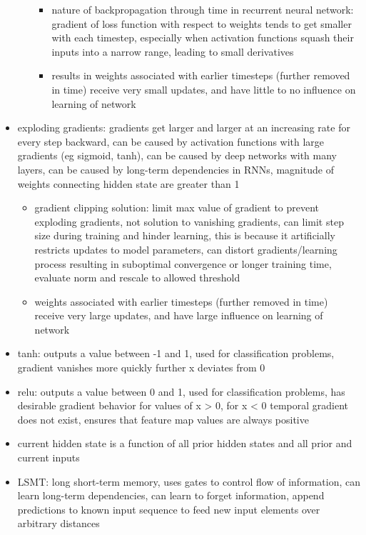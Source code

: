 \documentclass[10pt]{article}
\begin{document}
\begin{itemize}[label=\(\star\), leftmargin=1em, itemsep=-0.3em]
\begin{itemize}[label=\(\star\), leftmargin=1em, itemsep=-0.3em]
\begin{itemize}[label=\(\star\), leftmargin=1em, itemsep=-0.3em]
                    \item nature of backpropagation through time in recurrent neural network: gradient of loss function with respect to weights tends to get smaller with each timestep, especially when activation functions squash their inputs into a narrow range, leading to small derivatives
                    \item results in weights associated with earlier timesteps (further removed in time) receive very small updates, and have little to no influence on learning of network
                \end{itemize}
        \end{itemize}
    \item exploding gradients: gradients get larger and larger at an increasing rate for every step backward, can be caused by activation functions with large gradients (eg sigmoid, tanh), can be caused by deep networks with many layers, can be caused by long-term dependencies in RNNs, magnitude of weights connecting hidden state are greater than 1
        \begin{itemize}[label=\(\star\), leftmargin=1em, itemsep=-0.3em]
            \item gradient clipping solution: limit max value of gradient to prevent exploding gradients, not solution to vanishing gradients, can limit step size during training and hinder learning, this is because it artificially restricts updates to model parameters, can distort gradients/learning process resulting in suboptimal convergence or longer training time, evaluate norm and rescale to allowed
            threshold
            \item weights associated with earlier timesteps (further removed in time) receive very large updates, and have large influence on learning of network
        \end{itemize}
    \item tanh: outputs a value between -1 and 1, used for classification problems, gradient vanishes more quickly further x deviates from 0
    \item relu: outputs a value between 0 and 1, used for classification problems,  has desirable gradient behavior for values of x > 0, for x < 0 temporal gradient does not exist, ensures that feature map values are always positive
    \item current hidden state is a function of all prior hidden states and all prior and current inputs
    \item LSMT: long short-term memory, uses gates to control flow of information, can learn long-term dependencies, can learn to forget information, append predictions to known input sequence to feed new input elements over arbitrary distances
    \begin{itemize}[label=\(\star\), leftmargin=1em, itemsep=-0.3em]


\end{itemize}
\end{itemize}
\end{document}
